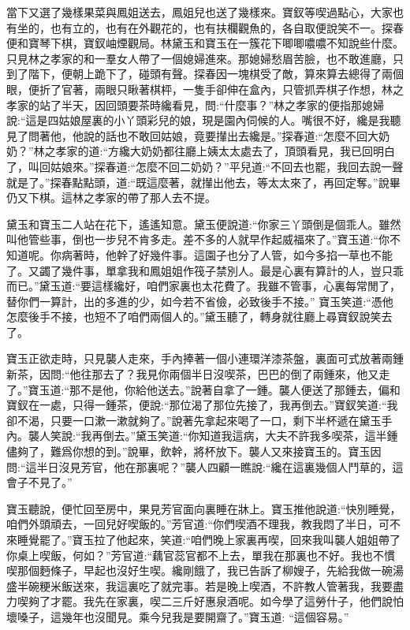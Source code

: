 \begin{parag}
    當下又選了幾樣果菜與鳳姐送去，鳳姐兒也送了幾樣來。寶釵等喫過點心，大家也有坐的，也有立的，也有在外觀花的，也有扶欄觀魚的，各自取便說笑不一。探春便和寶琴下棋，寶釵岫煙觀局。林黛玉和寶玉在一簇花下唧唧噥噥不知說些什麼。只見林之孝家的和一羣女人帶了一個媳婦進來。那媳婦愁眉苦臉，也不敢進廳，只到了階下，便朝上跪下了，碰頭有聲。探春因一塊棋受了敵，算來算去總得了兩個眼，便折了官著，兩眼只瞅著棋枰，一隻手卻伸在盒內，只管抓弄棋子作想，林之孝家的站了半天，因回頭要茶時纔看見，問:“什麼事？”林之孝家的便指那媳婦說:“這是四姑娘屋裏的小丫頭彩兒的娘，現是園內伺候的人。嘴很不好，纔是我聽見了問著他，他說的話也不敢回姑娘，竟要攆出去纔是。”探春道:“怎麼不回大奶奶？”林之孝家的道:“方纔大奶奶都往廳上姨太太處去了，頂頭看見，我已回明白了，叫回姑娘來。”探春道:“怎麼不回二奶奶？”平兒道:“不回去也罷，我回去說一聲就是了。”探春點點頭，道:“既這麼著，就攆出他去，等太太來了，再回定奪。”說畢仍又下棋。這林之孝家的帶了那人去不提。
\end{parag}


\begin{parag}
    黛玉和寶玉二人站在花下，遙遙知意。黛玉便說道:“你家三丫頭倒是個乖人。雖然叫他管些事，倒也一步兒不肯多走。差不多的人就早作起威福來了。”寶玉道:“你不知道呢。你病著時，他幹了好幾件事。這園子也分了人管，如今多掐一草也不能了。又蠲了幾件事，單拿我和鳳姐姐作筏子禁別人。最是心裏有算計的人，豈只乖而已。”黛玉道:“要這樣纔好，咱們家裏也太花費了。我雖不管事，心裏每常閒了，替你們一算計，出的多進的少，如今若不省儉，必致後手不接。” 寶玉笑道:“憑他怎麼後手不接，也短不了咱們兩個人的。”黛玉聽了，轉身就往廳上尋寶釵說笑去了。
\end{parag}


\begin{parag}
    寶玉正欲走時，只見襲人走來，手內捧著一個小連環洋漆茶盤，裏面可式放著兩鍾新茶，因問:“他往那去了？我見你兩個半日沒喫茶，巴巴的倒了兩鍾來，他又走了。”寶玉道:“那不是他，你給他送去。”說著自拿了一鍾。襲人便送了那鍾去，偏和寶釵在一處，只得一鍾茶，便說:“那位渴了那位先接了，我再倒去。”寶釵笑道:“我卻不渴，只要一口漱一漱就夠了。”說著先拿起來喝了一口，剩下半杯遞在黛玉手內。襲人笑說:“我再倒去。”黛玉笑道:“你知道我這病，大夫不許我多喫茶，這半鍾儘夠了，難爲你想的到。”說畢，飲幹，將杯放下。襲人又來接寶玉的。寶玉因問:“這半日沒見芳官，他在那裏呢？”襲人四顧一瞧說:“纔在這裏幾個人鬥草的，這會子不見了。”
\end{parag}


\begin{parag}
    寶玉聽說，便忙回至房中，果見芳官面向裏睡在牀上。寶玉推他說道:“快別睡覺，咱們外頭頑去，一回兒好喫飯的。”芳官道:“你們喫酒不理我，教我悶了半日，可不來睡覺罷了。”寶玉拉了他起來，笑道:“咱們晚上家裏再喫，回來我叫襲人姐姐帶了你桌上喫飯，何如？”芳官道:“藕官蕊官都不上去，單我在那裏也不好。我也不慣喫那個麪條子，早起也沒好生喫。纔剛餓了，我已告訴了柳嫂子，先給我做一碗湯盛半碗粳米飯送來，我這裏吃了就完事。若是晚上喫酒，不許教人管著我，我要盡力喫夠了才罷。我先在家裏，喫二三斤好惠泉酒呢。如今學了這勞什子，他們說怕壞嗓子，這幾年也沒聞見。乘今兒我是要開齋了。”寶玉道: “這個容易。”
\end{parag}


